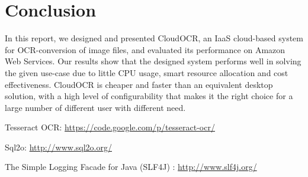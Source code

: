 \documentclass[a4paper]{IEEEtran}
\begin{document}
\section{Conclusion}
\label{sec:conclusion}
In this report, we designed and presented CloudOCR, an IaaS cloud-based system for OCR-conversion of image files, and evaluated its performance on Amazon Web Services.
Our results show that the designed system performs well in solving the given use-case due to little CPU usage,  smart resource allocation and cost effectiveness. CloudOCR is cheaper and faster than an equivalent desktop solution, with a high level of configurability that makes it the right choice for a large number of different user with different need.

\begin{thebibliography}{9}

 
 

 {
	Tesseract OCR: \url{https://code.google.com/p/tesseract-ocr/}
}

 {
	Sql2o: \url{http://www.sql2o.org/}
}

 {
	The Simple Logging Facade for Java (SLF4J) : \url{http://www.slf4j.org/}
}

\end{thebibliography}
\end{document}

